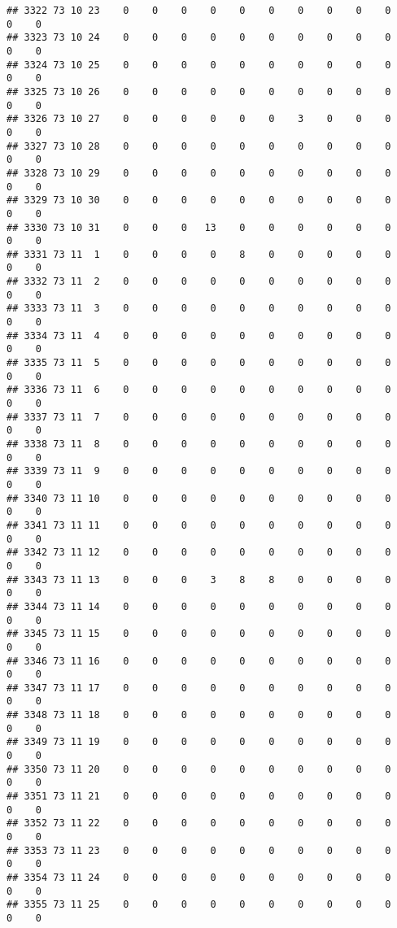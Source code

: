 \documentclass[]{article}
\begin{document}
\begin{verbatim}
## 3322 73 10 23    0    0    0    0    0    0    0    0    0    0    0    0
## 3323 73 10 24    0    0    0    0    0    0    0    0    0    0    0    0
## 3324 73 10 25    0    0    0    0    0    0    0    0    0    0    0    0
## 3325 73 10 26    0    0    0    0    0    0    0    0    0    0    0    0
## 3326 73 10 27    0    0    0    0    0    0    3    0    0    0    0    0
## 3327 73 10 28    0    0    0    0    0    0    0    0    0    0    0    0
## 3328 73 10 29    0    0    0    0    0    0    0    0    0    0    0    0
## 3329 73 10 30    0    0    0    0    0    0    0    0    0    0    0    0
## 3330 73 10 31    0    0    0   13    0    0    0    0    0    0    0    0
## 3331 73 11  1    0    0    0    0    8    0    0    0    0    0    0    0
## 3332 73 11  2    0    0    0    0    0    0    0    0    0    0    0    0
## 3333 73 11  3    0    0    0    0    0    0    0    0    0    0    0    0
## 3334 73 11  4    0    0    0    0    0    0    0    0    0    0    0    0
## 3335 73 11  5    0    0    0    0    0    0    0    0    0    0    0    0
## 3336 73 11  6    0    0    0    0    0    0    0    0    0    0    0    0
## 3337 73 11  7    0    0    0    0    0    0    0    0    0    0    0    0
## 3338 73 11  8    0    0    0    0    0    0    0    0    0    0    0    0
## 3339 73 11  9    0    0    0    0    0    0    0    0    0    0    0    0
## 3340 73 11 10    0    0    0    0    0    0    0    0    0    0    0    0
## 3341 73 11 11    0    0    0    0    0    0    0    0    0    0    0    0
## 3342 73 11 12    0    0    0    0    0    0    0    0    0    0    0    0
## 3343 73 11 13    0    0    0    3    8    8    0    0    0    0    0    0
## 3344 73 11 14    0    0    0    0    0    0    0    0    0    0    0    0
## 3345 73 11 15    0    0    0    0    0    0    0    0    0    0    0    0
## 3346 73 11 16    0    0    0    0    0    0    0    0    0    0    0    0
## 3347 73 11 17    0    0    0    0    0    0    0    0    0    0    0    0
## 3348 73 11 18    0    0    0    0    0    0    0    0    0    0    0    0
## 3349 73 11 19    0    0    0    0    0    0    0    0    0    0    0    0
## 3350 73 11 20    0    0    0    0    0    0    0    0    0    0    0    0
## 3351 73 11 21    0    0    0    0    0    0    0    0    0    0    0    0
## 3352 73 11 22    0    0    0    0    0    0    0    0    0    0    0    0
## 3353 73 11 23    0    0    0    0    0    0    0    0    0    0    0    0
## 3354 73 11 24    0    0    0    0    0    0    0    0    0    0    0    0
## 3355 73 11 25    0    0    0    0    0    0    0    0    0    0    0    0

\end{verbatim}
\end{document}
